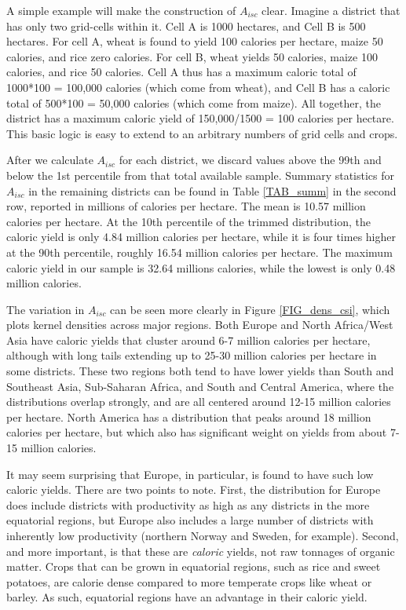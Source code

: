 \documentclass[11pt]{article}
\begin{document}
A simple example will make the construction of $A_{isc}$ clear. Imagine a district that has only two grid-cells within it. Cell A is 1000 hectares, and Cell B is 500 hectares. For cell A, wheat is found to yield 100 calories per hectare, maize 50 calories, and rice zero calories. For cell B, wheat yields 50 calories, maize 100 calories, and rice 50 calories. Cell A thus has a maximum caloric total of 1000*100 = 100,000 calories (which come from wheat), and Cell B has a caloric total of 500*100 = 50,000 calories (which come from maize). All together, the district has a maximum caloric yield of 150,000/1500 = 100 calories per hectare. This basic logic is easy to extend to an arbitrary numbers of grid cells and crops.

After we calculate $A_{isc}$ for each district, we discard values above the 99th and below the 1st percentile from that total available sample. Summary statistics for $A_{isc}$ in the remaining districts can be found in Table \ref{TAB_summ} in the second row, reported in millions of calories per hectare. The mean is 10.57 million calories per hectare. At the 10th percentile of the trimmed distribution, the caloric yield is only 4.84 million calories per hectare, while it is four times higher at the 90th percentile, roughly 16.54 million calories per hectare. The maximum caloric yield in our sample is 32.64 millions calories, while the lowest is only 0.48 million calories. 

The variation in $A_{isc}$ can be seen more clearly in Figure \ref{FIG_dens_csi}, which plots kernel densities across major regions. Both Europe and North Africa/West Asia have caloric yields that cluster around 6-7 million calories per hectare, although with long tails extending up to 25-30 million calories per hectare in some districts. These two regions both tend to have lower yields than South and Southeast Asia, Sub-Saharan Africa, and South and Central America, where the distributions overlap strongly, and are all centered around 12-15 million calories per hectare. North America has a distribution that peaks around 18 million calories per hectare, but which also has significant weight on yields from about 7-15 million calories. 

It may seem surprising that Europe, in particular, is found to have such low caloric yields. There are two points to note. First, the distribution for Europe does include districts with productivity as high as any districts in the more equatorial regions, but Europe also includes a large number of districts with inherently low productivity (northern Norway and Sweden, for example). Second, and more important, is that these are \textit{caloric} yields, not raw tonnages of organic matter. Crops that can be grown in equatorial regions, such as rice and sweet potatoes, are calorie dense compared to more temperate crops like wheat or barley. As such, equatorial regions have an advantage in their caloric yield. 
\end{document}
